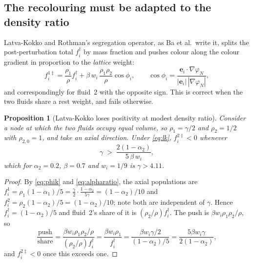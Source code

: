 \documentclass[11pt,a4paper]{article}
\theoremstyle{plain}
\newtheorem{proposition}{Proposition}
\theoremstyle{definition}
\newcommand{\ee}{\mathbf{e}}
\begin{document}
\subsection{The recolouring must be adapted to the density ratio}
\label{sec:recolour}

Latva-Kokko and Rothman's segregation operator, as Ba et al.\ write it, splits
the post-perturbation total $f_i^\dagger$ by mass fraction and pushes colour
along the colour gradient in proportion to the \emph{lattice} weight:
\begin{equation}
  f_i^{1\ddagger} = \frac{\rho_1}{\rho} f_i^\dagger
   + \beta\, w_i\, \frac{\rho_1\rho_2}{\rho}\cos\phi_i, \qquad
  \cos\phi_i = \frac{\ee_i\!\cdot\!\nabla\varphi_N}{|\ee_i|\,|\nabla\varphi_N|},
  \label{eq:lk}
\end{equation}
and correspondingly for fluid~2 with the opposite sign. This is correct when the
two fluids share a rest weight, and fails otherwise.

\begin{proposition}[Latva-Kokko loses positivity at modest density ratio]
\label{prop:lkfails}
Consider a node at which the two fluids occupy equal volume, so
$\rho_1 = \gamma/2$ and $\rho_2 = 1/2$ with $\rho_{2,0} = 1$, and take an axial
direction. Under \eqref{eq:lk}, $f_i^{2\ddagger} < 0$ whenever
\begin{equation}
  \gamma \;>\; \frac{2(1-\alpha_2)}{5\,\beta\,w_i},
  \label{eq:lkthreshold}
\end{equation}
which for $\alpha_2 = 0.2$, $\beta = 0.7$ and $w_i = 1/9$ is
$\gamma > 4.11$.
\end{proposition}

\begin{proof}
By \eqref{eq:phik} and \eqref{eq:alpharatio}, the axial populations are
$f_i^1 = \rho_1 (1-\alpha_1)/5 = \tfrac{\gamma}{2}\cdot\tfrac{1-\alpha_2}{5\gamma}
= (1-\alpha_2)/10$ and
$f_i^2 = \rho_2 (1-\alpha_2)/5 = (1-\alpha_2)/10$; note both are independent of
$\gamma$. Hence $f_i^\dagger = (1-\alpha_2)/5$ and fluid~2's share of it is
$(\rho_2/\rho) f_i^\dagger$. The push is $\beta w_i \rho_1\rho_2/\rho$, so
\begin{equation}
  \frac{\text{push}}{\text{share}}
  = \frac{\beta w_i \rho_1 \rho_2/\rho}{(\rho_2/\rho) f_i^\dagger}
  = \frac{\beta w_i \rho_1}{f_i^\dagger}
  = \frac{\beta w_i \gamma/2}{(1-\alpha_2)/5}
  = \frac{5\beta w_i \gamma}{2(1-\alpha_2)},
\end{equation}
and $f_i^{2\ddagger} < 0$ once this exceeds one. \qedhere
\end{proof}
\end{document}

